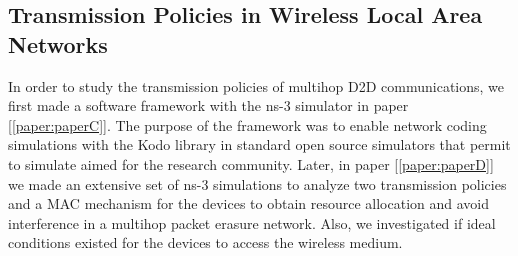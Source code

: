 \subsection{Transmission Policies in Wireless Local Area Networks}

In order to study the transmission policies of multihop \ac{D2D} communications, we first made a software framework with the ns-3 simulator in paper {[\ref{paper:paperC}]}. The purpose of the framework was to enable network coding simulations with the Kodo library in standard open source simulators that permit to simulate aimed for the research community. Later, in paper {[\ref{paper:paperD}]} we made an extensive set of ns-3 simulations to analyze two transmission policies and a \ac{MAC} mechanism for the devices to obtain resource allocation and avoid interference in a multihop packet erasure network. Also, we investigated if ideal conditions existed for the devices to access the wireless medium.